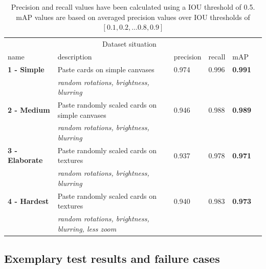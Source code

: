 \documentclass[a4paper]{article}
\begin{document}
\begin{table}[h]


\begin{tabular}{lllllr}
\hline
\multicolumn{5}{c}{Dataset situation} \\
\cline{1-2}
name    & description  & precision & recall & mAP \\
\hline
\textbf{1 - Simple}      & Paste cards on simple canvases    &  0.974  & 0.996 & \textbf{0.991} \\
          & \textit{random rotations, brightness, blurring}     & & & \\
\textbf{2 - Medium}      & Paste randomly scaled cards on simple canvases & 0.946 & 0.988 & \textbf{0.989} \\
          & \textit{random rotations, brightness, blurring}     & & & \\
\textbf{3 - Elaborate}       & Paste randomly scaled cards on textures & 0.937 & 0.978 & \textbf{0.971} \\
          & \textit{random rotations, brightness, blurring}     & & & \\
\textbf{4 - Hardest} & Paste randomly scaled cards on textures & 0.940 & 0.983 & \textbf{0.973} \\
          & \textit{random rotations, brightness, blurring, less zoom}     & & & \\
\hline


\end{tabular}
\caption{Precision and recall values have been calculated using a IOU threshold of 0.5. mAP values are based on averaged precision values over IOU thresholds of $[0.1, 0.2, \dots 0.8, 0.9] $  }
\label{tab:res}
\end{table}
\subsection*{Exemplary test results and failure cases}
\end{document}
